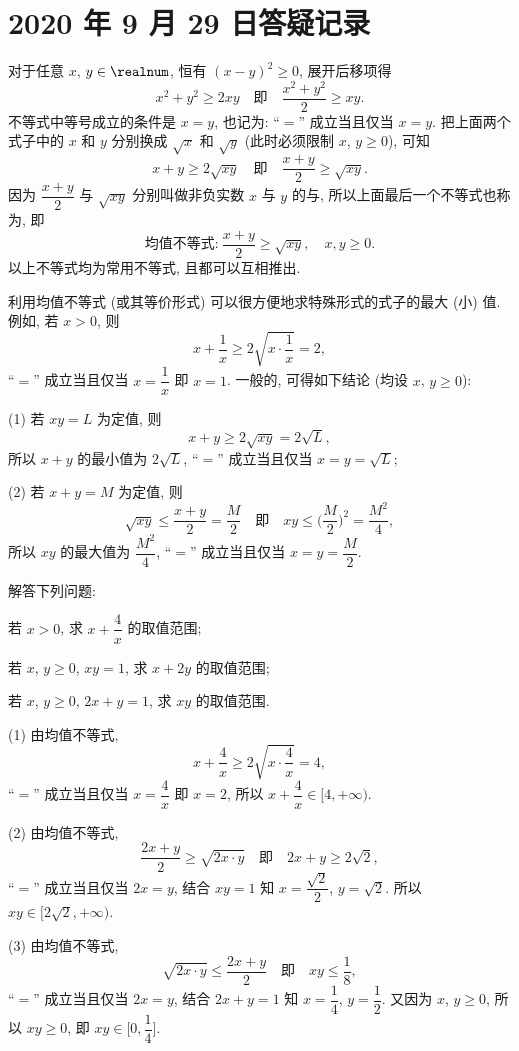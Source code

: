 \section{2020 年 9 月 29 日答疑记录}

对于任意 $x$, $y\in\realnum$, 恒有 $(x-y)^2\geqslant 0$, 展开后移项得
\[x^2+y^2\geqslant 2xy\quad\text{即}\quad \frac{x^2+y^2}2\geqslant xy.\]
不等式中等号成立的条件是 $x=y$, 也记为: ``$=$'' 成立当且仅当 $x=y$. 把上面两个式子中的 $x$ 和 $y$ 分别换成 $\sqrt{x}$ 和 $\sqrt{y}$ (此时必须限制 $x$, $y\geqslant 0$), 可知
\[x+y\geqslant 2\sqrt{xy}\quad\text{即}\quad \frac{x+y}2\geqslant \sqrt{xy}.\]
因为 $\dfrac{x+y}2$ 与 $\sqrt{xy}$ 分别叫做非负实数 $x$ 与 $y$ 的与, 所以上面最后一个不等式也称为, 即
\[\text{均值不等式:}\ \frac{x+y}2\geqslant \sqrt{xy},\quad x,y\geqslant 0.\]
以上不等式均为常用不等式, 且都可以互相推出.

利用均值不等式 (或其等价形式) 可以很方便地求特殊形式的式子的最大 (小) 值. 例如, 若 $x>0$, 则 
\[x+\dfrac1x\geqslant 2\sqrt{x\cdot\dfrac1x}=2,\]
``$=$'' 成立当且仅当 $x=\dfrac1x$ 即 $x=1$. 一般的, 可得如下结论 (均设 $x$, $y\geqslant 0$):

(1) 若 $xy=L$ 为定值, 则 
\[x+y\geqslant 2\sqrt{xy}=2\sqrt{L},\] 所以 $x+y$ 的最小值为 $2\sqrt{L}$, ``$=$'' 成立当且仅当 $x=y=\sqrt{L}$;

(2) 若 $x+y=M$ 为定值, 则 
\[\sqrt{xy}\leqslant \frac{x+y}2=\frac{M}2\quad\text{即}\quad
  xy\leqslant \biggl(\frac{M}2\biggr)^2= \frac{M^2}4,\]
所以 $xy$ 的最大值为 $\dfrac{M^2}4$, ``$=$'' 成立当且仅当 $x=y=\dfrac{M}2$.

\begin{example}
  解答下列问题: 
  \begin{subproblem}
    \item 若 $x>0$, 求 $x+\dfrac4x$ 的取值范围;
    \item 若 $x$, $y\geqslant 0$, $xy=1$, 求 $x+2y$ 的取值范围;
    \item 若 $x$, $y\geqslant 0$, $2x+y=1$, 求 $xy$ 的取值范围.
  \end{subproblem}
\end{example}
\begin{solution}
  (1) 由均值不等式, 
  \[x+\dfrac4x\geqslant 2\sqrt{x\cdot\dfrac4x}=4,\] ``$=$'' 成立当且仅当 $x=\dfrac4{x}$ 即 $x=2$, 所以 $x+\dfrac4x\in[4,+\infty)$.
  
  (2) 由均值不等式, 
  \[\frac{2x+y}2\geqslant \sqrt{2x\cdot y}\quad\text{即}\quad
    2x+y\geqslant 2\sqrt2,\]
  ``$=$'' 成立当且仅当 $2x=y$, 结合 $xy=1$ 知 $x=\dfrac{\sqrt2}2$, $y=\sqrt2$. 所以 $xy\in[2\sqrt2,+\infty)$.
  
  (3) 由均值不等式, 
  \[\sqrt{2x\cdot y}\leqslant \frac{2x+y}2\quad\text{即}\quad
    xy\leqslant \frac18,\]
  ``$=$'' 成立当且仅当 $2x=y$, 结合 $2x+y=1$ 知 $x=\dfrac14$, $y=\dfrac12$. 又因为 $x$, $y\geqslant 0$, 所以 $xy\geqslant 0$, 即 $xy\in\biggl[0,\dfrac14\biggr]$.
\end{solution}

